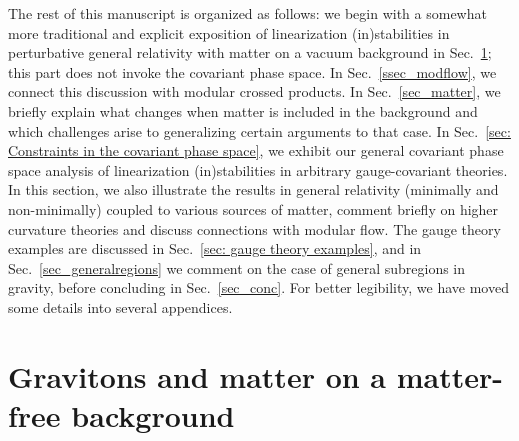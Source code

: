 \documentclass[]{jkpaper}
\theoremstyle{plain}
\theoremstyle{definition}
\begin{document}
The rest of this manuscript is organized as follows: we begin with a somewhat more traditional and explicit exposition of linearization (in)stabilities in perturbative general relativity with matter on a vacuum background in Sec.~\ref{sec:gravitonsandmatter}; this part does not invoke the covariant phase space. In Sec.~\ref{ssec_modflow}, we connect this discussion with modular crossed products. In Sec.~\ref{sec_matter}, we briefly explain what changes when matter is included in the background and which challenges arise to generalizing certain arguments to that case. In Sec.~\ref{sec: Constraints in the covariant phase space}, we  exhibit our general covariant phase space analysis of linearization (in)stabilities in arbitrary gauge-covariant theories. In this section, we also illustrate the results in general relativity  (minimally and non-minimally) coupled to various sources of matter, comment briefly on higher curvature theories and discuss connections with modular flow. The gauge theory examples are discussed in Sec.~\ref{sec: gauge theory examples}, and in Sec.~\ref{sec_generalregions} we comment on the case of general subregions in gravity, before concluding in Sec.~\ref{sec_conc}. For better legibility, we have moved some details into several appendices.  






















\section{Gravitons and matter on a matter-free background}
\label{sec:gravitonsandmatter}
\end{document}

